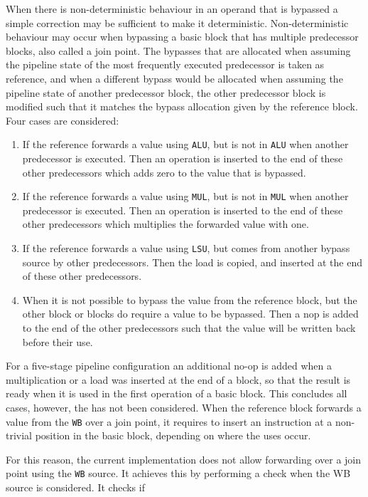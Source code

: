 When there is non-deterministic behaviour in an operand that is bypassed a simple correction may be sufficient to make it deterministic. Non-deterministic behaviour may occur when bypassing a basic block that has multiple predecessor blocks, also called a join point. The bypasses that are allocated when assuming the pipeline state of the most frequently executed predecessor is taken as reference, and when a different bypass would be allocated when assuming the pipeline state of another predecessor block, the other predecessor block is modified such that it matches the bypass allocation given by the reference block. Four cases are considered:

\begin{enumerate}
  \item If the reference forwards a value using \texttt{ALU}, but is not in \texttt{ALU} when another predecessor is executed. Then an operation is inserted to the end of these other predecessors which adds zero to the value that is bypassed.
  \item If the reference forwards a value using \texttt{MUL}, but is not in \texttt{MUL} when another predecessor is executed. Then an operation is inserted to the end of these other predecessors which multiplies the forwarded value with one.
  \item If the reference forwards a value using \texttt{LSU}, but comes from another bypass source by other predecessors. Then the load is copied, and inserted at the end of these other predecessors.
  \item When it is not possible to bypass the value from the reference block, but the other block or blocks do require a value to be bypassed. Then a nop is added to the end of the other predecessors such that the value will be written back before their use.
\end{enumerate}  

For a five-stage pipeline configuration an additional no-op is added when a multiplication or a load was inserted at the end of a block, so that the result is ready when it is used in the first operation of a basic block. This concludes all cases, however, the has not been considered. When the reference block forwards a value from the \texttt{WB} over a join point, it requires to insert an instruction at a non-trivial position in the basic block, depending on where the uses occur. 



For this reason, the current implementation does not allow forwarding over a join point using the \texttt{WB} source. It achieves this by performing a check when the WB source is considered. It checks if 

